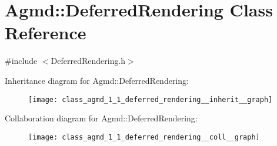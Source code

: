 \hypertarget{class_agmd_1_1_deferred_rendering}{\section{Agmd\+:\+:Deferred\+Rendering Class Reference}
\label{class_agmd_1_1_deferred_rendering}
}


{\ttfamily \#include $<$Deferred\+Rendering.\+h$>$}



Inheritance diagram for Agmd\+:\+:Deferred\+Rendering\+:\nopagebreak
\begin{figure}[H]
\begin{center}
\leavevmode
\texttt{[image: class\_agmd\_1\_1\_deferred\_rendering\_\_inherit\_\_graph]}
\end{center}
\end{figure}


Collaboration diagram for Agmd\+:\+:Deferred\+Rendering\+:\nopagebreak
\begin{figure}[H]
\begin{center}
\leavevmode
\texttt{[image: class\_agmd\_1\_1\_deferred\_rendering\_\_coll\_\_graph]}
\end{center}
\end{figure}
